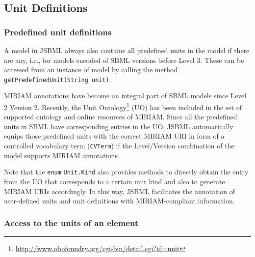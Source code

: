 \documentclass[
  BCOR12mm,
  letterpaper,
  11pt,
  headsepline,
  pointlessnumbers,
  tablecaptionabove,
  onelinecaption,
  headinclude,
  appendixprefix,
  idxtotoc,
  bibtotoc,
  twoside,
  titlepage
]{scrartcl}
\begin{document}
\subsection{Unit Definitions}

\subsubsection{Predefined unit definitions}

A model in JSBML always also contains all predefined units in the model
if there are any, i.e., for models encoded of SBML versions before Level
3. These can be accessed from an instance of model by calling the method
\texttt{getPredefinedUnit(String unit)}.

MIRIAM annotations \citep{Novere2005} have become an integral part of SBML models
since Level 2 Version 2. Recently, the Unit
Ontology\footnote{\url{http://www.obofoundry.org/cgi-bin/detail.cgi?id=unit}}
(UO) has been included in the set of supported ontology and online resources of
MIRIAM. Since all the predefined units in SBML have corresponding entries in the
UO, JSBML automatically equips those predefined units with the correct MIRIAM
URI in form of a controlled vocabulary term (\texttt{CVTerm}) if the
Level/Version combination of the model supports MIRIAM annotations.

Note that the \texttt{enum} \texttt{Unit.Kind}
 also provides
methods to directly
obtain the entry from the UO that corresponds to a certain unit kind and also to
generate MIRIAM URIs accordingly. In this way, JSBML facilitates the annotation
of user-defined units and unit definitions with MIRIAM-compliant information.

\subsubsection{Access to the units of an element}
\end{document}
